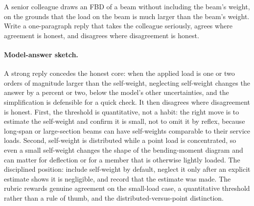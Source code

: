 \begin{exercise}
A senior colleague draws an FBD of a beam without including the
beam's weight, on the grounds that the load on the beam is much
larger than the beam's weight. Write a one-paragraph reply that
takes the colleague seriously, agrees where agreement is honest, and
disagrees where disagreement is honest.
\paragraph{Model-answer sketch.} A strong reply concedes the honest
core: when the applied load is one or two orders of magnitude larger
than the self-weight, neglecting self-weight changes the answer by a
percent or two, below the model's other uncertainties, and the
simplification is defensible for a quick check. It then disagrees where
disagreement is honest. First, the threshold is quantitative, not a
habit: the right move is to estimate the self-weight and confirm it is
small, not to omit it by reflex, because long-span or large-section
beams can have self-weights comparable to their service loads. Second,
self-weight is distributed while a point load is concentrated, so even a
small self-weight changes the shape of the bending-moment diagram and
can matter for deflection or for a member that is otherwise lightly
loaded. The disciplined position: include self-weight by default,
neglect it only after an explicit estimate shows it is negligible, and
record that the estimate was made. The rubric rewards genuine agreement
on the small-load case, a quantitative threshold rather than a rule of
thumb, and the distributed-versus-point distinction.
\end{exercise}

